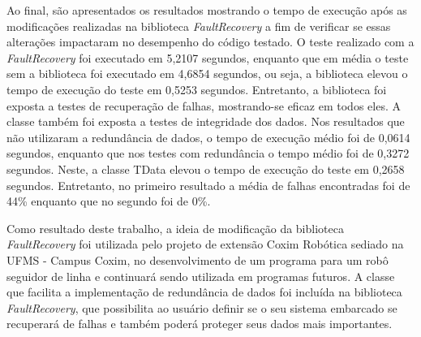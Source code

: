 {Ao final, são apresentados os resultados mostrando o tempo de execução após as modificações realizadas na biblioteca \textit{FaultRecovery} a fim de verificar se essas alterações impactaram no desempenho do código testado. O teste realizado com a \textit{FaultRecovery} foi executado em 5,2107 segundos, enquanto que em média o teste sem a biblioteca foi executado em 4,6854 segundos, ou seja, a biblioteca elevou o tempo de execução do teste em 0,5253 segundos. Entretanto, a biblioteca foi exposta a testes de recuperação de falhas, mostrando-se eficaz em todos eles. A classe também foi exposta a testes de integridade dos dados. Nos resultados que não utilizaram a redundância de dados, o tempo de execução médio foi de 0,0614 segundos, enquanto que nos testes com redundância o tempo médio foi de 0,3272 segundos. Neste, a classe TData elevou o tempo de execução do teste em 0,2658 segundos. Entretanto, no primeiro resultado a média de falhas encontradas foi de 44\% enquanto que no segundo foi de 0\%.

Como resultado deste trabalho, a ideia de modificação da biblioteca \textit{FaultRecovery} foi utilizada pelo projeto de extensão Coxim Robótica sediado na UFMS - Campus Coxim, no desenvolvimento de um programa para um robô seguidor de linha e continuará sendo utilizada em programas futuros. A classe que facilita a implementação de redundância de dados foi incluída na biblioteca \textit{FaultRecovery}, que possibilita ao usuário definir se o seu sistema embarcado se recuperará de falhas e também poderá proteger seus dados mais importantes.
	
}